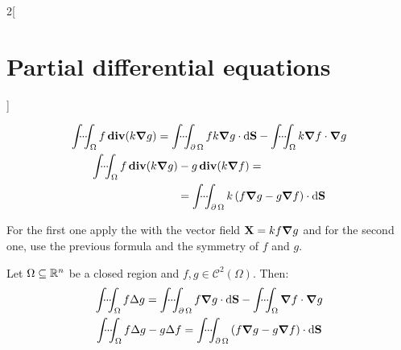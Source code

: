 \documentclass[../../../main_math.tex]{subfiles}
\begin{document}
\begin{multicols}{2}[\section{Partial differential equations}]
\begin{proposition}
    \begin{gather*}
      \idotsint_\Omega f\operatorname{\boldsymbol{\mathrm{div}}}(k\grad{g})                                =\idotsint_{\operatorname{\partial}{\Omega}}fk\grad{g}\cdot\dd{\boldsymbol{\mathrm{S}}} -\idotsint_\Omega k\grad{f}\cdot\grad{g} \\
      \begin{split}
        \idotsint_\Omega f\operatorname{\boldsymbol{\mathrm{div}}}(k\grad{g})-g\operatorname{\boldsymbol{\mathrm{div}}}(k\grad{f})= \hspace{2cm}\\\hspace{2cm}=\idotsint_{\operatorname{\partial}{\Omega}} k\left(f\grad{g}-g\grad{f}\right)\cdot\dd{\boldsymbol{\mathrm{S}}}
      \end{split}
    \end{gather*}
  \end{proposition}
  \begin{sproof}
    For the first one apply the  with the vector field $\boldsymbol{\mathrm{X}} = kf\grad{g}$ and for the second one, use the previous formula and the symmetry of $f$ and $g$.
  \end{sproof}
  \begin{corollary}\label{PDE:greenidentities}
    Let $\Omega\subseteq\mathbb{R}^n$ be a closed region and $f,g\in\mathcal{C}^2(\Omega)$. Then:
    \begin{gather*}
      \idotsint_\Omega f\Delta{g}                              =\idotsint_{\operatorname{\partial}{\Omega}}f\grad{g}\cdot\dd{\boldsymbol{\mathrm{S}}} -\idotsint_\Omega \grad{f}\cdot\grad{g} \\
      \idotsint_\Omega f\Delta{g}-g\Delta{f}  =\idotsint_{\operatorname{\partial}{\Omega}} \left(f\grad{g}-g\grad{f}\right)\cdot\dd{\boldsymbol{\mathrm{S}}}
    \end{gather*}
  \end{corollary}

\end{multicols}
\end{document}
